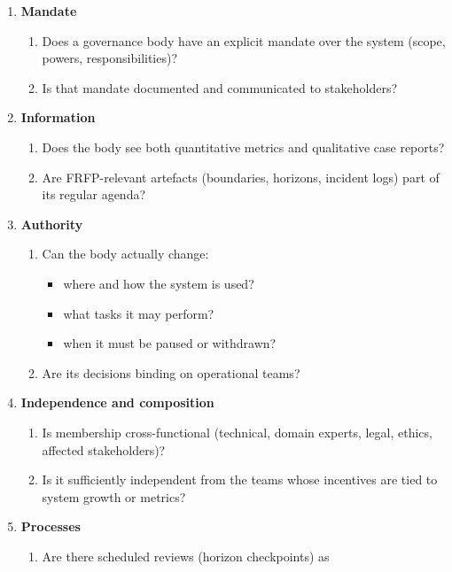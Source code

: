 \begin{enumerate}
  \item \textbf{Mandate}
        \begin{enumerate}
          \item Does a governance body have an explicit mandate over the
                system (scope, powers, responsibilities)?
          \item Is that mandate documented and communicated to
                stakeholders?
        \end{enumerate}
  \item \textbf{Information}
        \begin{enumerate}
          \item Does the body see both quantitative metrics and
                qualitative case reports?
          \item Are FRFP-relevant artefacts (boundaries, horizons,
                incident logs) part of its regular agenda?
        \end{enumerate}
  \item \textbf{Authority}
        \begin{enumerate}
          \item Can the body actually change:
                \begin{itemize}
                  \item where and how the system is used?
                  \item what tasks it may perform?
                  \item when it must be paused or withdrawn?
                \end{itemize}
          \item Are its decisions binding on operational teams?
        \end{enumerate}
  \item \textbf{Independence and composition}
        \begin{enumerate}
          \item Is membership cross-functional
                (technical, domain experts, legal, ethics, affected
                stakeholders)?
          \item Is it sufficiently independent from the teams whose
                incentives are tied to system growth or metrics?
        \end{enumerate}
  \item \textbf{Processes}
        \begin{enumerate}
          \item Are there scheduled reviews (horizon checkpoints) as

\end{enumerate}
\end{enumerate}
